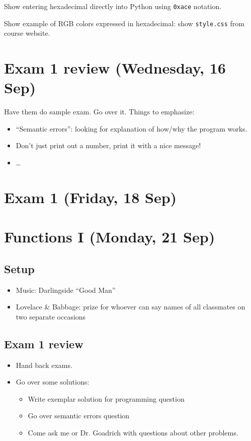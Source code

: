 \documentclass{article}
\begin{document}
Show entering hexadecimal directly into Python using \verb|0xace|
notation.

Show example of RGB colors expressed in hexadecimal: show
\verb|style.css| from course website.

\newpage

\section{Exam 1 review (Wednesday, 16 Sep)}

Have them do sample exam. Go over it.  Things to emphasize:
\begin{itemize}
\item ``Semantic errors'': looking for explanation of how/why the
  program works.
\item Don't just print out a number, print it with a nice message!
\item \dots
\end{itemize}

\section{Exam 1 (Friday, 18 Sep)}

\newpage

\section*{Functions I (Monday, 21 Sep)}

\subsection*{Setup}
\begin{itemize}
\item Music: Darlingside ``Good Man''
\item Lovelace \& Babbage: prize for whoever can say names of all
  classmates on two separate occasions
\end{itemize}

\subsection*{Exam 1 review}
\begin{itemize}
\item Hand back exams.
\item Go over some solutions:
  \begin{itemize}
  \item Write exemplar solution for programming question
  \item Go over semantic errors question
  \item Come ask me or Dr. Goadrich with questions about other problems.
  \end{itemize}
\end{itemize}
\end{document}
